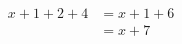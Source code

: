 \documentclass[preview]{standalone}
\begin{document}
\begin{align*}
x+1+2+4& =x+1+6\\ & = x+7
\end{align*}
\end{document}
